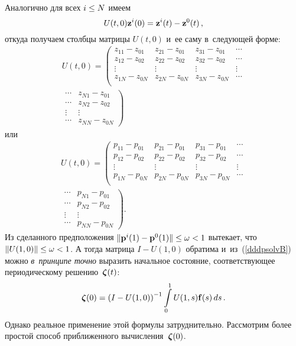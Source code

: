 \begin{multicols}{2}
Аналогично для всех $i \hm\le N$ имеем
\begin{equation*}
U(t,0){\mathbf z}^i(0)={\mathbf z}^i(t)-{\mathbf z}^0(t)\,,
\end{equation*}
откуда получаем столбцы матрицы $U(t,0)$ и~ее саму в~следующей
форме:
\begin{multline*}
U(t,0)=\left(
\begin{array}{cccc}
z_{11}-z_{01} & z_{21}-z_{01} & z_{31}-z_{01} & \cdots \\
z_{12}-z_{02} & z_{22}-z_{02} & z_{32}-z_{02} & \cdots \\
\vdots & \vdots & \vdots &\vdots\\
z_{1N}-z_{0N} & z_{2N}-z_{0N} & z_{3N}-z_{0N} & \cdots \\
\end{array}\right.\\
\left.\begin{array}{cc}
\cdots& z_{N1}-z_{01}\\  
\cdots& z_{N2}-z_{02}\\  
\vdots& \vdots\\                   
\cdots& z_{NN}-z_{0N}
\end{array}
\right)
\end{multline*}
или
\begin{multline*}
U(t,0)=\left(
\begin{array}{cccc}
p_{11}-p_{01} & p_{21}-p_{01} & p_{31}-p_{01} & \cdots \\ 
p_{12}-p_{02} & p_{22}-p_{02} & p_{32}-p_{02} & \cdots\\  
\vdots & \vdots & \vdots &\vdots\\
p_{1N}-p_{0N} & p_{2N}-p_{0N} & p_{3N}-p_{0N} & \cdots\\  
\end{array}      \right. \\
\left.\begin{array}{cc}
\cdots &p_{N1}-p_{01}\\
\cdots &p_{N2}-p_{02}      \\   
\vdots&\vdots\\
\cdots &       p_{NN}-p_{0N}  
\end{array}
\right).
\end{multline*}
Из сделанного предположения $\|\mathbf{p}^i(1)-\mathbf{p}^0(1)\|\hm\le 
\omega\hm<1$
вытекает, что $\|U(1,0)\|\hm\le \omega<1$. А тогда матрица $I-U(1,0)$
обратима и~из~(\ref{dddpsolvB}) можно {\it в~принципе точно}
выразить начальное состояние, соответствующее периодическому
решению~$\boldsymbol{\zeta}(t)$:
\begin{equation}
\boldsymbol{\zeta}(0)=\left(I-U(1,0)\right)^{-1}\int\limits_0^1 U(1,s) {\mathbf f}(s) \,
ds\,. 
\label{dddpper}
\end{equation}
Однако реальное применение этой формулы затруднительно. Рассмотрим
более простой способ приближенного вычисления~$\boldsymbol{\zeta}(0)$.



\end{multicols}
